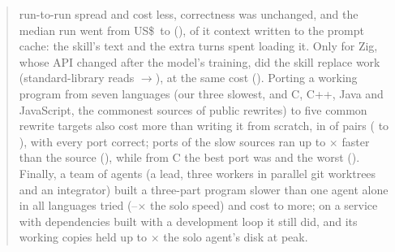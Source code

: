 \documentclass[11pt,a4paper]{article}
\begin{document}
\begin{abstract}
run-to-run spread and \NSkillCheaper{} cost less, correctness was unchanged, and the median run went from
US\$\,\SkillRunCostBase{} to \SkillRunCostArm{} (\SkillRunCostPct), \SkillShareWrite{} of it context
written to the prompt cache: the skill's text and the extra turns spent loading it. Only for Zig, whose API changed after the model's
training, did the skill replace work (standard-library reads \ZigStdBase{}$\to$\ZigStdArm), at the same
cost (\SkillDeltaZig). Porting a working program from seven languages (our three slowest, and C, C++, Java and JavaScript, the
commonest sources of public rewrites) to five common rewrite
targets also cost more than writing it from scratch, in \NPortCostlier{} of \NPortPairs{} pairs
(\PortDeltaMin{} to \PortDeltaMax), with every port correct; ports of the slow sources ran up to
\PortSpeedMax$\times$ faster than the source (\PortSpeedMaxPair), while from C the best port was
\PortBestC{} and the worst \PortWorstC{} (\PortWorstTargetC). Finally, a team of agents (a lead, three workers in parallel git worktrees and an
integrator) built a three-part program slower than one agent alone in all \NSwarmLangs{} languages tried
(\SwarmSpeedMin--\SwarmSpeedMax$\times$ the solo speed) and cost \SwarmCostMin{} to \SwarmCostMax{} more;
on a service with dependencies built with a development loop it still did, and its working copies held up
to \NotesDiskMax$\times$ the solo agent's disk at peak.
\end{abstract}
\end{document}
